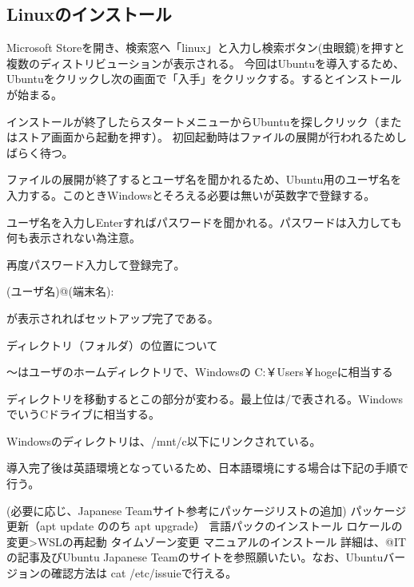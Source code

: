 \documentclass[autodetect-engine,dvipdfmx-if-dvi,ja=standard,a4j]{bxjsarticle}
\begin{document}
		\subsection{Linuxのインストール}
			Microsoft Storeを開き、検索窓へ「linux」と入力し検索ボタン(虫眼鏡)を押すと複数のディストリビューションが表示される。
			今回はUbuntuを導入するため、Ubuntuをクリックし次の画面で「入手」をクリックする。するとインストールが始まる。\par
			インストールが終了したらスタートメニューからUbuntuを探しクリック（またはストア画面から起動を押す）。
			初回起動時はファイルの展開が行われるためしばらく待つ。\par\noindent
			ファイルの展開が終了するとユーザ名を聞かれるため、Ubuntu用のユーザ名を入力する。このときWindowsとそろえる必要は無いが英数字で登録する。\par\noindent
			ユーザ名を入力しEnterすればパスワードを聞かれる。パスワードは入力しても何も表示されない為注意。\par\noindent
			再度パスワード入力して登録完了。\par
			(ユーザ名)@(端末名):~\par
			が表示されればセットアップ完了である。\par
			ディレクトリ（フォルダ）の位置について\par
			～はユーザのホームディレクトリで、Windowsの C:￥Users￥hogeに相当する\par
			ディレクトリを移動するとこの部分が変わる。最上位は/で表される。WindowsでいうCドライブに相当する。\par
			Windowsのディレクトリは、/mnt/c以下にリンクされている。\par
			導入完了後は英語環境となっているため、日本語環境にする場合は下記の手順で行う。\par
			(必要に応じ、Japanese Teamサイト参考にパッケージリストの追加)
			パッケージ更新（apt update ののち apt upgrade）
			言語パックのインストール
			ロケールの変更>WSLの再起動
			タイムゾーン変更
			マニュアルのインストール
			詳細は、@ITの記事及びUbuntu Japanese Teamのサイトを参照願いたい。なお、Ubuntuバージョンの確認方法は cat /etc/issuieで行える。\par

			
\end{document}

